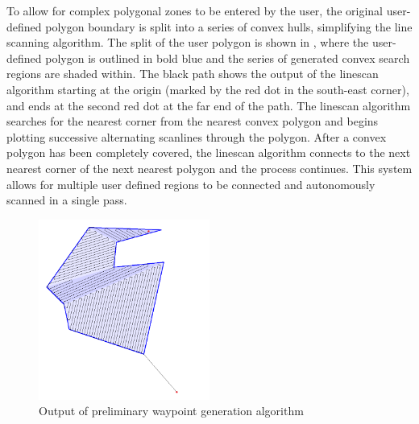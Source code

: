\documentclass[main.tex]{subfiles}
\begin{document}
To allow for complex polygonal zones to be entered by the user, the original user-defined polygon boundary is split into a series of convex hulls, simplifying the line scanning algorithm. The split of the user polygon is shown in , where the user-defined polygon is outlined in bold blue and the series of generated convex search regions are shaded within. The black path shows the output of the linescan algorithm starting at the origin (marked by the red dot in the south-east corner), and ends at the second red dot at the far end of the path. The linescan algorithm searches for the nearest corner from the nearest convex polygon and begins plotting successive alternating scanlines through the polygon. After a convex polygon has been completely covered, the linescan algorithm connects to the next nearest corner of the next nearest polygon and the process continues. This system allows for multiple user defined regions to be connected and autonomously scanned in a single pass.

\begin{figure}[ht]
\includegraphics[width=0.5\textwidth]{4-DetailedDesign/lineScanAlgorithm.png}
\centering
\caption{Output of preliminary waypoint generation algorithm} 
\end{figure}
\end{document}
